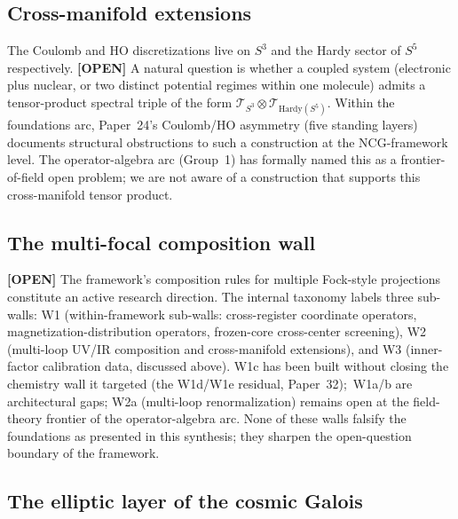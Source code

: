\documentclass[aps,pra,twocolumn,superscriptaddress,longbibliography]{revtex4-2}
\begin{document}
\subsection*{Cross-manifold extensions}

The Coulomb and HO discretizations live on $S^3$ and the Hardy sector
of $S^5$ respectively.  \textbf{[OPEN]} A natural question is whether a coupled system
(electronic plus nuclear, or two distinct potential regimes within one
molecule) admits a tensor-product spectral triple of the form
$\mathcal{T}_{S^3} \otimes \mathcal{T}_{\mathrm{Hardy}(S^5)}$.  Within
the foundations arc, Paper~24's Coulomb/HO asymmetry (five standing layers)
documents structural obstructions to such a construction at the
NCG-framework level.  The operator-algebra arc (Group~1) has formally
named this as a frontier-of-field open problem; we are not aware of a
construction that supports this cross-manifold tensor product.

\subsection*{The multi-focal composition wall}

\textbf{[OPEN]} The framework's composition rules for multiple Fock-style projections
constitute an active research direction.  The internal taxonomy
labels three sub-walls: W1 (within-framework sub-walls:
cross-register coordinate operators, magnetization-distribution
operators, frozen-core cross-center screening), W2 (multi-loop UV/IR
composition and cross-manifold extensions), and W3 (inner-factor
calibration data, discussed above).  W1c has been built without
closing the chemistry wall it targeted (the W1d/W1e residual, Paper~32);\
W1a/b are architectural gaps; W2a (multi-loop renormalization) remains open at the
field-theory frontier of the operator-algebra arc.  None of these
walls falsify the foundations as presented in this synthesis; they
sharpen the open-question boundary of the framework.

\subsection*{The elliptic layer of the cosmic Galois}
\end{document}
